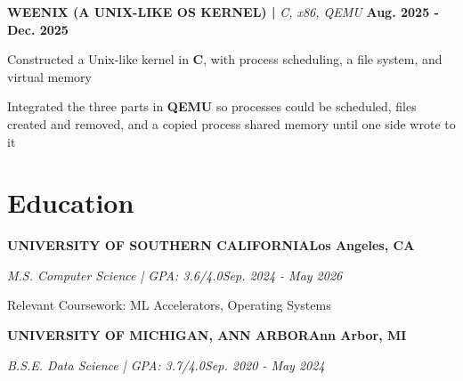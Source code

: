 \documentclass[10pt]{article}
\renewcommand{\note}[1]{#1\par}
\newcommand{\school}[4]{%
  \vspace{2pt}%
  \textbf{\MakeUppercase{#1}}\hfill\textbf{#2}\par
  \vspace{0.5pt}%
  \textit{#3}\hfill\textit{#4}\par
}
\newcommand{\proj}[4]{%
  \vspace{3pt}%
  \textbf{\MakeUppercase{#1} | }\textit{#2}\hfill
  \textbf{#4}%
  \notblank{#3}{\ \textbf{| #3}}{}%
  \par
}
\begin{document}
\proj{Weenix (A Unix-Like OS Kernel)}{C, x86, QEMU}{USC}{Aug. 2025 - Dec. 2025}
\begin{bullets}
  \item Constructed a Unix-like kernel in \textbf{C}, with process scheduling, a file system, and virtual memory
  \item Integrated the three parts in \textbf{QEMU} so processes could be scheduled, files created and removed, and a copied process shared memory until one side wrote to it
\end{bullets}

\section{Education}
\vspace{-2pt}
\school{University of Southern California}{Los Angeles, CA}{M.S. Computer Science | GPA: 3.6/4.0}{Sep. 2024 - May 2026}
\note{Relevant Coursework: ML Accelerators, Operating Systems}

\school{University of Michigan, Ann Arbor}{Ann Arbor, MI}{B.S.E. Data Science | GPA: 3.7/4.0}{Sep. 2020 - May 2024}
\end{document}
